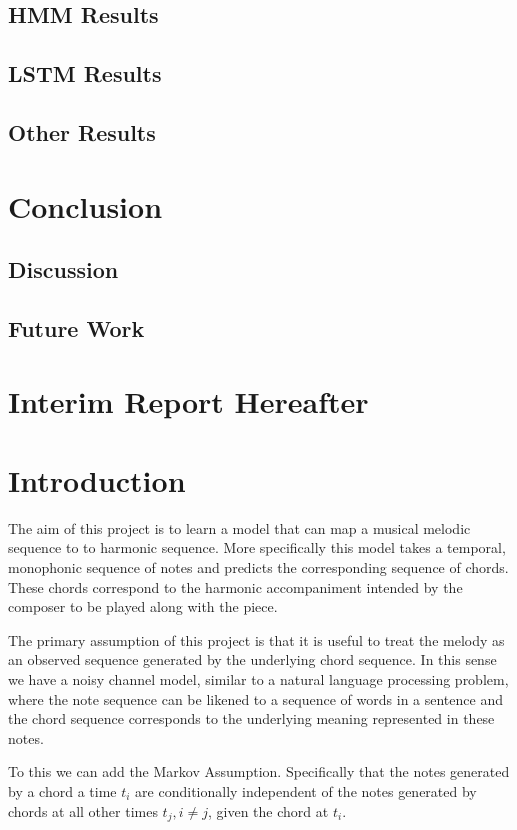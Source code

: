 \documentclass[bsc,singlespacing,logo, parskip, deptreport]{infthesis}
\begin{document}
\section{HMM Results}

\section{LSTM Results}

\section{Other Results}


\chapter{Conclusion}

\section{Discussion}

\section{Future Work}


\chapter{Interim Report Hereafter}
\chapter{Introduction}
The aim of this project is to learn a model that can map a musical melodic sequence to to harmonic sequence. More specifically this model takes a temporal, monophonic sequence of notes and predicts the corresponding sequence of chords. These chords correspond to the harmonic accompaniment intended by the composer to be played along with the piece.

The primary assumption of this project is that it is useful to treat the melody as an observed sequence generated by the underlying chord sequence. In this sense we have a noisy channel model, similar to a natural language processing problem, where the note sequence can be likened to a sequence of words in a sentence and the chord sequence corresponds to the underlying meaning represented in these notes.

To this we can add the Markov Assumption. Specifically that the notes generated by a chord a time $t_i$ are conditionally independent of the notes generated by chords at all other times $t_j, i \neq j$, given the chord at $t_i$.
\end{document}
